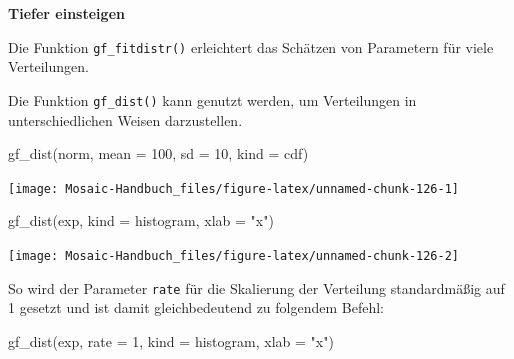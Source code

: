 \documentclass[
  ngerman,
]{scrbook}
\newenvironment{Shaded}{\begin{snugshade}}{\end{snugshade}}
\newcommand{\AttributeTok}[1]{\textcolor[rgb]{0.77,0.63,0.00}{#1}}
\newcommand{\DecValTok}[1]{\textcolor[rgb]{0.00,0.00,0.81}{#1}}
\newcommand{\FunctionTok}[1]{\textcolor[rgb]{0.00,0.00,0.00}{#1}}
\newcommand{\NormalTok}[1]{#1}
\newcommand{\StringTok}[1]{\textcolor[rgb]{0.31,0.60,0.02}{#1}}
\newenvironment{tiefereinsteigen}[1]
  {
  \begin{itemize}
  \renewcommand{\labelitemi}{
    \raisebox{2.6\height}[0pt][0pt]{
      {\setkeys{Gin}{width=7em,keepaspectratio}
        {\normalsize \textcolor{dark-fom-green}\faSearch}}
        }
  }
  \begin{blackbox}
         \bgroup\color{dark-fom-green}
          {\textbf{Tiefer einsteigen}}
        \egroup
  \item
  }
  {
  \end{blackbox}
  \end{itemize}
  }
\begin{document}
\begin{tiefereinsteigen}{tiefereinsteigen}
Die Funktion \texttt{gf\_fitdistr()} erleichtert das Schätzen von Parametern für viele Verteilungen.

\end{tiefereinsteigen}

Die Funktion \texttt{gf\_dist()} kann genutzt werden, um Verteilungen in unterschiedlichen Weisen darzustellen.

\begin{Shaded}
\begin{Highlighting}[]
\FunctionTok{gf\_dist}\NormalTok{(}\StringTok{\textquotesingle{}norm\textquotesingle{}}\NormalTok{, }\AttributeTok{mean =} \DecValTok{100}\NormalTok{, }\AttributeTok{sd =} \DecValTok{10}\NormalTok{, }\AttributeTok{kind =} \StringTok{\textquotesingle{}cdf\textquotesingle{}}\NormalTok{)}
\end{Highlighting}
\end{Shaded}

\begin{center}\texttt{[image: Mosaic-Handbuch\_files/figure-latex/unnamed-chunk-126-1]} \end{center}

\begin{Shaded}
\begin{Highlighting}[]
\FunctionTok{gf\_dist}\NormalTok{(}\StringTok{\textquotesingle{}exp\textquotesingle{}}\NormalTok{, }\AttributeTok{kind =} \StringTok{\textquotesingle{}histogram\textquotesingle{}}\NormalTok{, }\AttributeTok{xlab =} \StringTok{"x"}\NormalTok{)}
\end{Highlighting}
\end{Shaded}

\begin{center}\texttt{[image: Mosaic-Handbuch\_files/figure-latex/unnamed-chunk-126-2]} \end{center}

So wird der Parameter \texttt{rate} für die Skalierung der Verteilung standardmäßig auf 1 gesetzt und ist damit gleichbedeutend zu folgendem Befehl:

\begin{Shaded}
\begin{Highlighting}[]
\FunctionTok{gf\_dist}\NormalTok{(}\StringTok{\textquotesingle{}exp\textquotesingle{}}\NormalTok{, }\AttributeTok{rate =} \DecValTok{1}\NormalTok{, }\AttributeTok{kind =} \StringTok{\textquotesingle{}histogram\textquotesingle{}}\NormalTok{, }\AttributeTok{xlab =} \StringTok{"x"}\NormalTok{)}
\end{Highlighting}
\end{Shaded}
\end{document}
